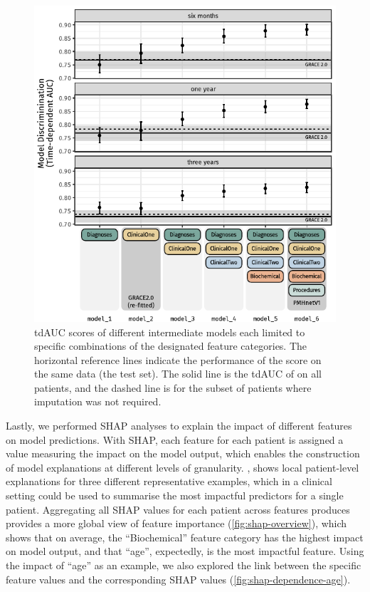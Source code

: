 \begin{figure}[htb]
    \includegraphics[trim=5mm 8mm 0 0]{graphics/pmhnet-v1-category-overview.pdf}
    \caption[\acs{tdAUC} of  Models with Different Feature Combinations]{%
        \acs{tdAUC} scores of different intermediate  models each
        limited to specific combinations of the designated feature categories.
        The horizontal reference lines indicate the performance of the \graceii{}
        score on the same data (the test set). The solid line is the \ac{tdAUC}
        of \graceii{} on all patients, and the dashed line is for the subset
        of patients where imputation was not required.%
    }
    \label{fig:category-overview}
\end{figure}%

Lastly, we performed \ac{SHAP} analyses to explain the impact of different
features on model predictions. With \ac{SHAP}, each feature for each patient
is assigned a value measuring the impact on the model output, which enables
the construction of model explanations at different levels of granularity.
, shows local patient-level explanations for 
three different representative examples, which in a clinical setting could
be used to summarise the most impactful predictors for a single patient.
Aggregating all \ac{SHAP} values for each patient across features produces
provides a more global view of feature importance (\cref{fig:shap-overview}),
which shows that on average, the \enquote{Biochemical} feature category 
has the highest impact on model output, and that \enquote{age}, expectedly, 
is the most impactful feature. Using the impact of \enquote{age} as an example,
we also explored the link between the specific feature values 
and the corresponding \ac{SHAP} values (\cref{fig:shap-dependence-age}).

